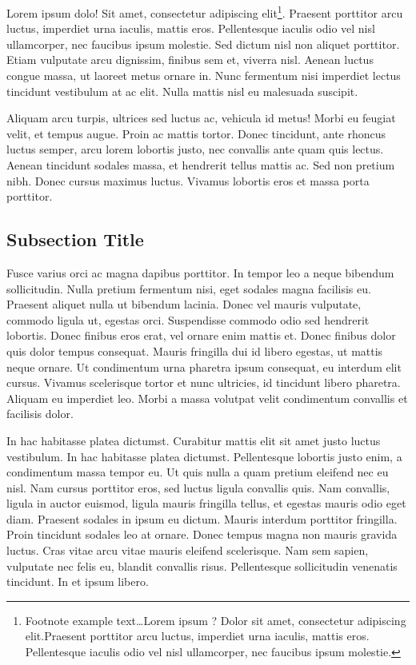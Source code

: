 \documentclass[
	11pt, %
	fleqn, %
	a4paper, %
]{LegrandOrangeBook}
\begin{document}
Lorem ipsum dolo!
Sit amet, consectetur adipiscing elit\footnote{Footnote example text\ldots Lorem ipsum ?
Dolor sit amet, consectetur adipiscing elit.Praesent porttitor arcu luctus, imperdiet urna iaculis, mattis eros.
Pellentesque iaculis odio vel nisl ullamcorper, nec faucibus ipsum molestie.}.
Praesent porttitor arcu luctus, imperdiet urna iaculis, mattis eros.
Pellentesque iaculis odio vel nisl ullamcorper, nec faucibus ipsum molestie.
Sed dictum nisl non aliquet porttitor.
Etiam vulputate arcu dignissim, finibus sem et, viverra nisl.
Aenean luctus congue massa, ut laoreet metus ornare in.
Nunc fermentum nisi imperdiet lectus tincidunt vestibulum at ac elit.
Nulla mattis nisl eu malesuada suscipit.

Aliquam arcu turpis, ultrices sed luctus ac, vehicula id metus!
Morbi eu feugiat velit, et tempus augue.
Proin ac mattis tortor.
Donec tincidunt, ante rhoncus luctus semper, arcu lorem lobortis justo, nec convallis ante quam quis lectus.
Aenean tincidunt sodales massa, et hendrerit tellus mattis ac.
Sed non pretium nibh.
Donec cursus maximus luctus.
Vivamus lobortis eros et massa porta porttitor.



\subsection{Subsection Title}

Fusce varius orci ac magna dapibus porttitor.
In tempor leo a neque bibendum sollicitudin.
Nulla pretium fermentum nisi, eget sodales magna facilisis eu.
Praesent aliquet nulla ut bibendum lacinia.
Donec vel mauris vulputate, commodo ligula ut, egestas orci.
Suspendisse commodo odio sed hendrerit lobortis.
Donec finibus eros erat, vel ornare enim mattis et.
Donec finibus dolor quis dolor tempus consequat.
Mauris fringilla dui id libero egestas, ut mattis neque ornare.
Ut condimentum urna pharetra ipsum consequat, eu interdum elit cursus.
Vivamus scelerisque tortor et nunc ultricies, id tincidunt libero pharetra.
Aliquam eu imperdiet leo.
Morbi a massa volutpat velit condimentum convallis et facilisis dolor.

In hac habitasse platea dictumst.
Curabitur mattis elit sit amet justo luctus vestibulum.
In hac habitasse platea dictumst.
Pellentesque lobortis justo enim, a condimentum massa tempor eu.
Ut quis nulla a quam pretium eleifend nec eu nisl.
Nam cursus porttitor eros, sed luctus ligula convallis quis.
Nam convallis, ligula in auctor euismod, ligula mauris fringilla tellus, et egestas mauris odio eget diam.
Praesent sodales in ipsum eu dictum.
Mauris interdum porttitor fringilla.
Proin tincidunt sodales leo at ornare.
Donec tempus magna non mauris gravida luctus.
Cras vitae arcu vitae mauris eleifend scelerisque.
Nam sem sapien, vulputate nec felis eu, blandit convallis risus.
Pellentesque sollicitudin venenatis tincidunt.
In et ipsum libero.
\end{document}
